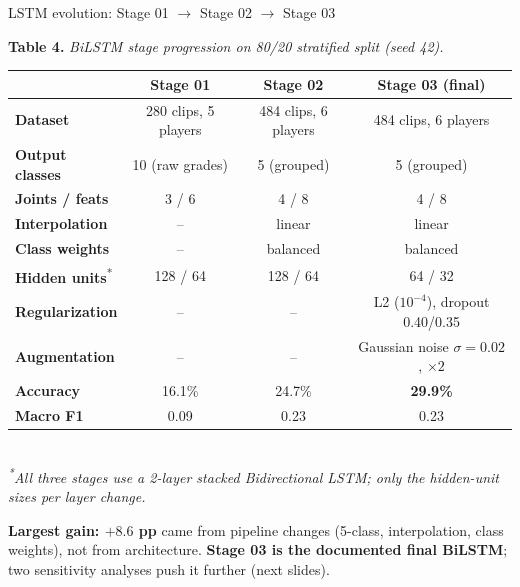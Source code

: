 \begin{frame}{LSTM evolution: Stage 01 $\rightarrow$ Stage 02 $\rightarrow$ Stage 03}
\hypertarget{sub:evolution}{}%
\setlength{\tabcolsep}{3pt}
\renewcommand{\arraystretch}{0.95}
\footnotesize
\begin{center}
\textbf{Table 4.} \itshape BiLSTM stage progression on 80/20 stratified split (seed 42).\\[1pt]
\upshape
\begin{tabular}{l c c c}
\toprule
 & \textbf{Stage 01} & \textbf{Stage 02} & \textbf{Stage 03 (final)} \\
\midrule
\textbf{Dataset}        & 280 clips, 5 players & 484 clips, 6 players & 484 clips, 6 players \\
\textbf{Output classes} & 10 (raw grades)      & 5 (grouped)          & 5 (grouped) \\
\textbf{Joints / feats} & 3 / 6                & 4 / 8                & 4 / 8 \\
\textbf{Interpolation}  & --                   & linear               & linear \\
\textbf{Class weights}  & --                   & balanced             & balanced \\
\textbf{Hidden units}\textsuperscript{*}   & 128 / 64             & 128 / 64             & \alert{64 / 32} \\
\textbf{Regularization} & --                   & --                   & L2 ($10^{-4}$), dropout 0.40/0.35 \\
\textbf{Augmentation}   & --                   & --                   & Gaussian noise $\sigma\!=\!0.02$, $\times 2$ \\
\midrule
\textbf{Accuracy}       & 16.1\%               & 24.7\%               & \textbf{29.9\%} \\
\textbf{Macro F1}       & 0.09                 & 0.23                 & 0.23 \\
\bottomrule
\end{tabular}\\[2pt]
{\scriptsize\itshape \textsuperscript{*}All three stages use a \alert{2-layer stacked Bidirectional LSTM}; only the hidden-unit sizes per layer change.}
\end{center}
\vspace{2pt}
\begin{infoBox}\scriptsize
\textbf{Largest gain: $+8.6$ pp} came from \alert{pipeline changes} (5-class, interpolation, class weights), not from architecture. \textbf{\color{tecdark}Stage 03 is the documented final BiLSTM}; two sensitivity analyses push it further (next slides).
\end{infoBox}
\end{frame}

